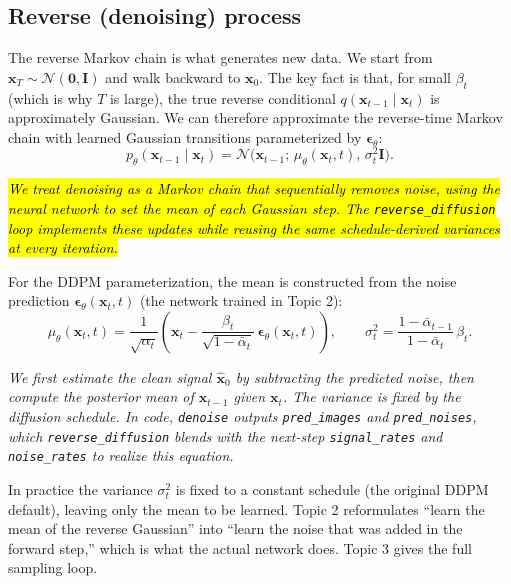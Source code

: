 \documentclass[11pt]{article}
\theoremstyle{remark}
\begin{document}
\subsection{Reverse (denoising) process}

The reverse Markov chain is what generates new data. We start from $\mathbf{x}_T \sim \mathcal{N}(\mathbf{0}, \mathbf{I})$ and walk backward to $\mathbf{x}_0$. The key fact is that, for small $\beta_t$ (which is why $T$ is large), the true reverse conditional $q(\mathbf{x}_{t-1} \mid \mathbf{x}_t)$ is approximately Gaussian. We can therefore approximate the reverse-time Markov chain with learned Gaussian transitions parameterized by $\boldsymbol{\epsilon}_\theta$:
\begin{equation}
p_\theta(\mathbf{x}_{t-1} \mid \mathbf{x}_t) = \mathcal{N}\!\Big(\mathbf{x}_{t-1};\, \mu_\theta(\mathbf{x}_t, t),\, \sigma_t^2 \mathbf{I}\Big).
\label{eq:reverse-step}
\end{equation}

\hl{\textit{We treat denoising as a Markov chain that sequentially removes noise, using the neural network to set the mean of each Gaussian step. The \texttt{reverse\_diffusion} loop implements these updates while reusing the same schedule-derived variances at every iteration.}}

For the DDPM parameterization, the mean is constructed from the noise prediction $\boldsymbol{\epsilon}_\theta(\mathbf{x}_t, t)$ (the network trained in Topic 2):
\begin{equation}
\mu_\theta(\mathbf{x}_t, t) = \frac{1}{\sqrt{\alpha_t}}\!\left(\mathbf{x}_t - \frac{\beta_t}{\sqrt{1-\bar{\alpha}_t}}\,\boldsymbol{\epsilon}_\theta(\mathbf{x}_t, t)\right),
\qquad
\sigma_t^2 = \frac{1-\bar{\alpha}_{t-1}}{1-\bar{\alpha}_t}\,\beta_t.
\label{eq:reverse-mean}
\end{equation}

\textit{We first estimate the clean signal $\hat{\mathbf{x}}_0$ by subtracting the predicted noise, then compute the posterior mean of $\mathbf{x}_{t-1}$ given $\mathbf{x}_t$. The variance is fixed by the diffusion schedule. In code, \texttt{denoise} outputs \texttt{pred\_images} and \texttt{pred\_noises}, which \texttt{reverse\_diffusion} blends with the next-step \texttt{signal\_rates} and \texttt{noise\_rates} to realize this equation.}

In practice the variance $\sigma_t^2$ is fixed to a constant schedule (the original DDPM default), leaving only the mean to be learned. Topic 2 reformulates ``learn the mean of the reverse Gaussian'' into ``learn the noise that was added in the forward step,'' which is what the actual network does. Topic 3 gives the full sampling loop.
\end{document}
